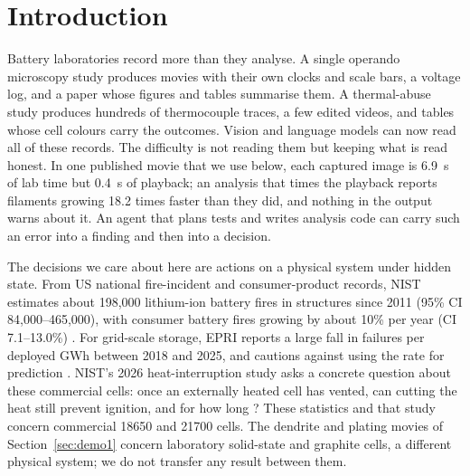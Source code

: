 \documentclass[11pt]{article}
\begin{document}
\section{Introduction}\label{sec:intro}

Battery laboratories record more than they analyse. A single operando microscopy study produces movies with their
own clocks and scale bars, a voltage log, and a paper whose figures and tables summarise them. A thermal-abuse study
produces hundreds of thermocouple traces, a few edited videos, and tables whose cell colours carry the outcomes. Vision
and language models can now read all of these records. The difficulty is not reading them but keeping what is read
honest. In one published movie that we use below, each captured image is 6.9~s of lab time but 0.4~s of playback;
an analysis that times the playback reports filaments growing 18.2 times faster than they did, and nothing in the
output warns about it. An agent that plans tests and writes analysis code can carry such an error into a finding
and then into a decision.

The decisions we care about here are actions on a physical system under hidden state. From US national fire-incident
and consumer-product records, NIST estimates about 198{,}000 lithium-ion battery fires in structures since 2011 (95\%
CI 84{,}000--465{,}000), with consumer battery fires growing by about 10\% per year (CI 7.1--13.0\%)
\citep{gilbert2026risk}. For grid-scale storage,
EPRI reports a large fall in failures per deployed GWh between 2018 and 2025, and cautions against using the rate for
prediction \citep{epri2026bess}. NIST's 2026 heat-interruption study asks a concrete question about these commercial
cells: once an externally heated cell has vented, can cutting the heat still prevent ignition, and for how long
\citep{tam2026intervention}? These statistics and that study concern commercial 18650 and 21700 cells. The dendrite
and plating movies of Section~\ref{sec:demo1} concern laboratory solid-state and graphite cells, a different physical
system; we do not transfer any result between them.
\end{document}
